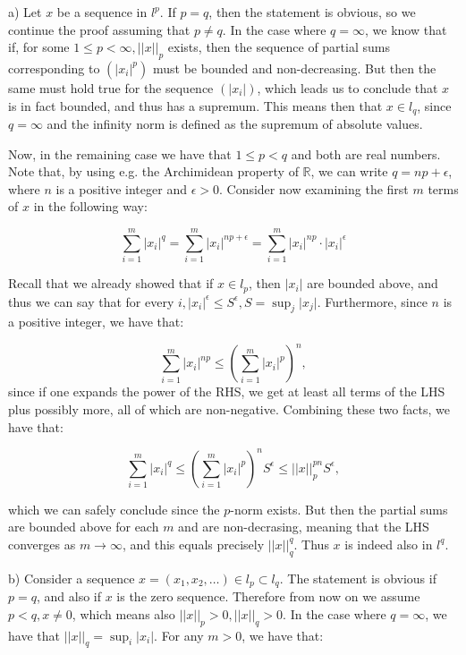 \begin{solution}
    
    a) Let $x$ be a sequence in $l^p$.
    If $p = q$, then the statement is obvious, so we continue the proof assuming that $p \neq q$.
    In the case where $q = \infty$, we know that if, for some $1 \leq p < \infty, \lvert \lvert x \rvert \rvert _p$ exists, then the sequence of partial sums corresponding to $(\lvert x_i \rvert^p)$ must be bounded and non-decreasing.
    But then the same must hold true for the sequence $(\lvert x_i \rvert)$, which leads us to conclude that $x$ is in fact bounded, and thus has a supremum.
    This means then that $x \in l_q$, since $q = \infty$ and the infinity norm is defined as the supremum of absolute values.

    Now, in the remaining case we have that $1 \leq p < q$ and both are real numbers.
    Note that, by using e.g. the Archimidean property of $\mathbb{R}$, we can write $q = np + \epsilon$, where $n$ is a positive integer and $\epsilon > 0$.
    Consider now examining the first $m$ terms of $x$ in the following way:

    $$\sum_{i=1}^{m} \lvert x_i \rvert^q = \sum_{i=1}^{m} \lvert x_i \rvert^{np + \epsilon} = \sum_{i=1}^{m} \lvert x_i \rvert^{np} \cdot \lvert x_i \rvert^{\epsilon}$$

    Recall that we already showed that if $x \in l_p$, then $\lvert x_i \rvert$ are bounded above, and thus we can say that for every $i, \lvert x_i \rvert^\epsilon \leq S^\epsilon, S =\sup_{j} \lvert x_j \rvert$.
    Furthermore, since $n$ is a positive integer, we have that:
    
    $$\sum_{i=1}^{m} \lvert x_i \rvert^{np} \leq (\sum_{i=1}^{m} \lvert x_i \rvert^p)^n,$$
    since if one expands the power of the RHS, we get at least all terms of the LHS plus possibly more, all of which are non-negative.
    Combining these two facts, we have that:

    $$\sum_{i=1}^{m} \lvert x_i \rvert^q \leq (\sum_{i=1}^{m} \lvert x_i \rvert^p)^n S^\epsilon \leq \lvert \lvert x \rvert \rvert_p^{pn} S^{\epsilon},$$

    which we can safely conclude since the $p$-norm exists.
    But then the partial sums are bounded above for each $m$ and are non-decrasing, meaning that the LHS converges as $m \rightarrow \infty$, and this equals precisely $\lvert \lvert x \rvert \rvert_q^q$.
    Thus $x$ is indeed also in $l^q$.

    b) Consider a sequence $x = (x_1, x_2, \ldots) \in l_p \subset l_q$. 
    The statement is obvious if $p = q$, and also if $x$ is the zero sequence.
    Therefore from now on we assume $p < q, x \neq 0$, which means also $\lvert \lvert x \rvert \rvert _p > 0, \lvert \lvert x \rvert \rvert _q > 0$.
    In the case where $q = \infty$, we have that $\lvert \lvert x \rvert \rvert_q = \sup_{i} \lvert x_i \rvert$.
    For any $m > 0$, we have that:


\end{solution}
